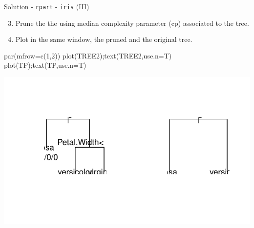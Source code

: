 \documentclass[
  10pt,
  ignorenonframetext,
]{beamer}
\newenvironment{Shaded}{}{}
\newcommand{\DataTypeTok}[1]{#1}
\newcommand{\DecValTok}[1]{#1}
\newcommand{\KeywordTok}[1]{\textcolor[rgb]{0.00,0.00,1.00}{#1}}
\newcommand{\NormalTok}[1]{#1}
\newcommand{\OperatorTok}[1]{#1}
\newcommand{\StringTok}[1]{\textcolor[rgb]{0.00,0.50,0.50}{#1}}
\providecommand{\tightlist}{%
  \setlength{\itemsep}{0pt}\setlength{\parskip}{0pt}}
\begin{document}
\begin{frame}[fragile]{Solution - \texttt{rpart} - \texttt{iris} (III)}
\protect\hypertarget{solution---rpart---iris-iii}{}

\begin{enumerate}
[1)]
\setcounter{enumi}{2}
\tightlist
\item
  Prune the the using median complexity parameter (cp) associated to the
  tree.
\end{enumerate}

\begin{Shaded}
\end{Shaded}

\begin{enumerate}
[1)]
\setcounter{enumi}{3}
\tightlist
\item
  Plot in the same window, the pruned and the original tree.
\end{enumerate}

\begin{Shaded}
\begin{Highlighting}[]
\KeywordTok{par}\NormalTok{(}\DataTypeTok{mfrow=}\KeywordTok{c}\NormalTok{(}\DecValTok{1}\NormalTok{,}\DecValTok{2}\NormalTok{))}
\KeywordTok{plot}\NormalTok{(TREE2);}\KeywordTok{text}\NormalTok{(TREE2,}\DataTypeTok{use.n=}\NormalTok{T)}
\KeywordTok{plot}\NormalTok{(TP);}\KeywordTok{text}\NormalTok{(TP,}\DataTypeTok{use.n=}\NormalTok{T)}
\end{Highlighting}
\end{Shaded}

\includegraphics{ml_exercises_c1_treesbagging_files/figure-beamer/unnamed-chunk-10-1.pdf}

\end{frame}
\end{document}
